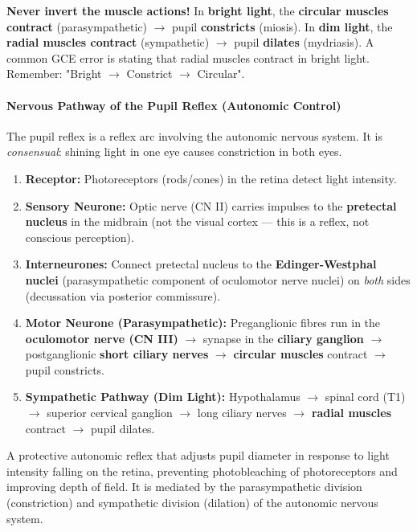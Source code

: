 \documentclass[11pt]{article}
\newcommand{\cle}[1]{{\popxbold\color{popdark}#1}}
\begin{document}
\begin{attention}
\textbf{Never invert the muscle actions!} In \textbf{bright light}, the \textbf{circular muscles contract} (parasympathetic) $\to$ pupil \textbf{constricts} (miosis). In \textbf{dim light}, the \textbf{radial muscles contract} (sympathetic) $\to$ pupil \textbf{dilates} (mydriasis). A common GCE error is stating that radial muscles contract in bright light. Remember: "Bright $\to$ Constrict $\to$ Circular".
\end{attention}

\paragraph{Nervous Pathway of the Pupil Reflex (Autonomic Control)}
The pupil reflex is a \cle{reflex arc} involving the autonomic nervous system. It is \emph{consensual}: shining light in one eye causes constriction in both eyes.

\begin{enumerate}
    \item \textbf{Receptor:} Photoreceptors (rods/cones) in the retina detect light intensity.
    \item \textbf{Sensory Neurone:} Optic nerve (CN II) carries impulses to the \textbf{pretectal nucleus} in the midbrain (not the visual cortex — this is a reflex, not conscious perception).
    \item \textbf{Interneurones:} Connect pretectal nucleus to the \textbf{Edinger-Westphal nuclei} (parasympathetic component of oculomotor nerve nuclei) on \emph{both} sides (decussation via posterior commissure).
    \item \textbf{Motor Neurone (Parasympathetic):} Preganglionic fibres run in the \textbf{oculomotor nerve (CN III)} $\to$ synapse in the \textbf{ciliary ganglion} $\to$ postganglionic \textbf{short ciliary nerves} $\to$ \textbf{circular muscles} contract $\to$ pupil constricts.
    \item \textbf{Sympathetic Pathway (Dim Light):} Hypothalamus $\to$ spinal cord (T1) $\to$ superior cervical ganglion $\to$ long ciliary nerves $\to$ \textbf{radial muscles} contract $\to$ pupil dilates.
\end{enumerate}

\begin{definition}
A protective autonomic reflex that adjusts pupil diameter in response to light intensity falling on the retina, preventing photobleaching of photoreceptors and improving depth of field. It is mediated by the parasympathetic division (constriction) and sympathetic division (dilation) of the autonomic nervous system.
\end{definition}
\end{document}
